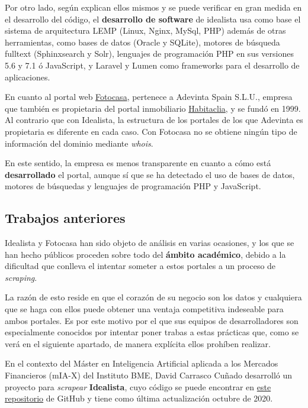\documentclass[12pt]{article}
\begin{document}
Por otro lado, según explican ellos mismos y se puede verificar en gran medida en el desarrollo del código, el \textbf{desarrollo de software} de idealista usa como base el sistema de arquitectura LEMP (Linux, Nginx, MySql, PHP) además de otras herramientas, como bases de datos (Oracle y SQLite), motores de búsqueda fulltext (Sphinxsearch y Solr), lenguajes de programación PHP en sus versiones 5.6 y 7.1 ó JavaScript, y Laravel y Lumen como frameworks para el desarrollo de aplicaciones.

En cuanto al portal web \href{https://www.fotocasa.es/es/}{Fotocasa}, pertenece a Adevinta Spain S.L.U., empresa que también es propietaria del portal inmobiliario \href{https://www.habitaclia.com/madrid}{Habitaclia}, y se fundó en 1999. Al contrario que con Idealista, la estructura de los portales de los que Adevinta es propietaria es diferente en cada caso. Con Fotocasa no se obtiene ningún tipo de información del dominio mediante \textit{whois}. 

En este sentido, la empresa es menos transparente en cuanto a cómo está \textbf{desarrollado} el portal, aunque sí que se ha detectado el uso de bases de datos, motores de búsquedas y lenguajes de programación PHP y JavaScript.

\vspace{-1.5em}\subsection*{Trabajos anteriores}\vspace{-1.0em}

Idealista y Fotocasa han sido objeto de análisis en varias ocasiones, y los que se han hecho públicos proceden sobre todo del \textbf{ámbito académico}, debido a la dificultad que conlleva el intentar someter a estos portales a un proceso de \textit{scraping}.

La razón de esto reside en que el corazón de su negocio son los datos y cualquiera que se haga con ellos puede obtener una ventaja competitiva indeseable para ambos portales. Es por este motivo por el que sus equipos de desarrolladores son especialmente conocidos por intentar poner trabas a estas prácticas que, como se verá en el siguiente apartado, de manera explícita ellos prohíben realizar.

En el contexto del Máster en Inteligencia Artificial aplicada a los Mercados Financieros (mIA-X) del Instituto BME, David Carrasco Cuñado desarrolló un proyecto para \textit{scrapear} \textbf{Idealista}, cuyo código se puede encontrar en \href{https://github.com/David-Carrasco/Scrapy-Idealista}{este repositorio} de GitHub y tiene como última actualización octubre de 2020. 
\end{document}
